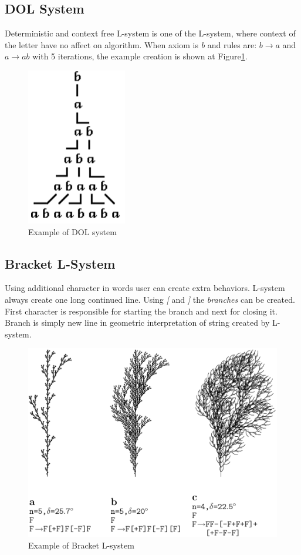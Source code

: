 \documentclass[b5paper,twoside,11pt]{article}
\renewcommand{\figurename}{Figure}
\begin{document}
\subsection{DOL System}
Deterministic and context free L-system is one of the L-system, where context of the letter have no affect on algorithm. When axiom is \textit{b} and rules are: $b \rightarrow a$ and $a \rightarrow ab$ with 5 iterations, the example creation is shown at \figurename\ref{DOL}.

\begin{figure}[!htp]
\centering
  \includegraphics[width=0.15\linewidth]{DOL-system}
\caption{Example of DOL system\cite{prusinABOP} \label{DOL}}
\end{figure}
\FloatBarrier
\subsection{Bracket L-System}
Using additional character in words user can create extra behaviors. L-system always create one long continued line. Using \textit{[} and \textit{]} the \textit{branches} can be created. First character is responsible for starting the branch and next for closing it. Branch is simply new line in geometric interpretation of string created by L-system.
\begin{figure}[!htp]
\centering
  \includegraphics[width=0.7\linewidth]{branchingL}
\caption{Example of Bracket L-system\cite{prusinABOP} \label{branchingL}}
\end{figure}
\end{document}
